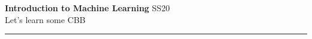 \documentclass[10pt,landscape,a4paper]{extarticle}
\begin{document}
\begin{multicols*}{4}

\noindent\large{\textbf{Introduction to Machine Learning} SS20} \\
\normalsize{Let's learn some CBB\hspace{0.5cm}}\vspace{0.1cm}\hrule
















\end{multicols*}
\end{document}
